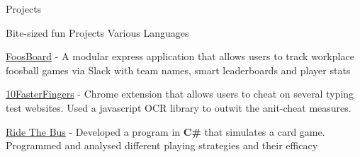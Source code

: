 \documentclass{resume} %
\newcommand{\award}[2]{#1 \hfill {\em #2}}
\begin{document}
\begin{rSection}{Projects}
    \vspace{1em}

    \begin{sideproject}
        {Bite-sized fun Projects}
        {Various Languages}
        {}
        {
            \item {\href{https://github.com/wbhildeb/FoosBoard}{\faGithub{} FoosBoard}} - A modular express application that allows users to track workplace foosball games via Slack with team names, smart leaderboards and player stats
            \item {\href{https://github.com/wbhildeb/Ten-Faster-Fingers}{\faGithub{} 10FasterFingers}} - Chrome extension that allows users to cheat on several typing test websites. Used a javascript OCR library to outwit the anit-cheat measures.
            \item {\href{https://github.com/wbhildeb/Ride-The-Bus}{\faGithub{} Ride The Bus}} - Developed a program in \textbf{C\#} that simulates a card game. Programmed and analysed different playing strategies and their efficacy
        }
    \end{sideproject}



\end{rSection}




    
\end{document}

